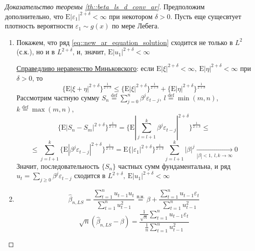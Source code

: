 \documentclass[12pt]{article}
\newcommand*{\defeq}{\stackrel{\text{def}}{=}}
\def\eps{ \varepsilon }
\def\E{ \mathrm{E} }
\begin{document}
\newpage
\begin{proof}[Доказательство теоремы \ref{th::beta_ls_d_conv_ar}]
    Предположим дополнительно, что $\E\left\lvert \eps_1\right\rvert ^{2+\delta}<\infty$ при некотором $\delta>0$.
    Пусть еще сущесвтует плотность вероятности $\eps_1\sim g(x)$ по мере Лебега.
    \begin{enumerate}
        \item Покажем, что ряд \eqref{eq::new_ar_equation_solution} сходится не только в $L^2$ (с.к.),
        но и в $L^{2+\delta}$, и, значит, $\E\left\lvert u_1\right\rvert ^{2+\delta}<\infty$

        \underline{Справедливо неравенство Миньковского}:
        если $\E\left\lvert \xi\right\rvert ^{2+\delta}<\infty,\ \E\left\lvert \eta\right\rvert ^{2+\delta}<\infty$ при $\delta>0$,  то
        \[\{\E\left\lvert \xi+\eta\right\rvert ^{2+\delta}\}^{\frac{1}{2+\delta}}\leq\{\E\left\lvert \xi\right\rvert ^{2+\delta}\}^{\frac{1}{2+\delta}}+\{\E\left\lvert \eta\right\rvert ^{2+\delta}\}^{\frac{1}{2+\delta}}\]
        Рассмотрим частную сумму $S_n\defeq\sum_{j=0}^n\beta^j\eps_{t-j},\ l\defeq\min(m,n)$, $k\defeq\max(m,n)$, 
        \[\{\E\left\lvert S_n-S_m\right\rvert ^{2+\delta}\}^{\frac{1}{2+\delta}}=\{\E\left\lvert \sum_{j=l+1}^{k}\beta^j\eps_{t-j}\right\rvert ^{2+\delta}\}^{\frac{1}{2+\delta}}\leq\]
        \[\leq\sum_{j=l+1}^k\{\E\left\lvert \beta^j\eps_{t-j}\right\rvert ^{2+\delta}\}^{\frac{1}{2+\delta}}=\E\{\left\lvert \eps_1\right\rvert ^{2+\delta}\}^{\frac{1}{2+\delta}}\sum_{j=l+1}^k\left\lvert \beta\right\rvert ^j\xrightarrow[\left\lvert \beta\right\rvert <1,\ l,k\rightarrow\infty]{} 0\]
        Значит, последовательность $\{S_n\}$ частных сумм фундаментальна, и ряд $u_t=\sum_{j\geq0}\beta^j\eps_{t-j}$ сходится в $L^{2+\delta},\ \E\left\lvert u_1\right\rvert ^{2+\delta}<\infty$
        
        \item 
        \[\widehat{\beta}_{n,LS}=\frac{\sum_{t=1}^nu_{t-1}u_t}{\sum_{t=1}^nu_{t-1}^2}\overset{\text{п.н.}}{=}\beta+\frac{\sum_{t=1}^nu_{t-1}\eps_t}{\sum_{t=1}^nu_{t-1}^2}\]
        \[\sqrt{n}(\widehat{\beta}_{n,LS}-\beta)=\frac{\frac{1}{\sqrt{n}}\sum_{t=1}^nu_{t-1}\eps_t}{\frac{1}{n}\sum_{t=1}^nu_{t-1}^2}\]


\end{enumerate}
\end{proof}
\end{document}
